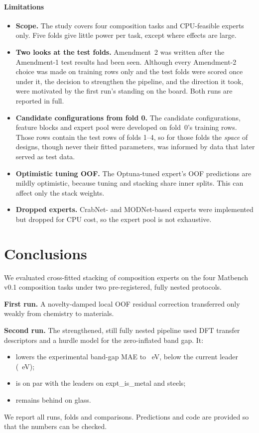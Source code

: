 \paragraph{Limitations}
\begin{itemize}
\item \textbf{Scope.} The study covers four composition tasks and CPU-feasible experts only. Five folds give little power per task, except where effects are large.
\item \textbf{Two looks at the test folds.} Amendment~2 was written after the Amendment-1 test results had been seen. Although every Amendment-2 choice was made on training rows only and the test folds were scored once under it, the decision to strengthen the pipeline, and the direction it took, were motivated by the first run's standing on the board. Both runs are reported in full.
\item \textbf{Candidate configurations from fold 0.} The candidate configurations, feature blocks and expert pool were developed on fold~0's training rows. Those rows contain the test rows of folds 1--4, so for those folds the \emph{space} of designs, though never their fitted parameters, was informed by data that later served as test data.
\item \textbf{Optimistic tuning OOF.} The Optuna-tuned expert's OOF predictions are mildly optimistic, because tuning and stacking share inner splits. This can affect only the stack weights.
\item \textbf{Dropped experts.} CrabNet- and MODNet-based experts were implemented but dropped for CPU cost, so the expert pool is not exhaustive.
\end{itemize}

\section{Conclusions}
\label{sec:conclusions}
We evaluated cross-fitted stacking of composition experts on the four Matbench v0.1 composition tasks under two pre-registered, fully nested protocols.

\textbf{First run.} A novelty-damped local OOF residual correction transferred only weakly from chemistry to materials.

\textbf{Second run.} The strengthened, still fully nested pipeline used DFT transfer descriptors and a hurdle model for the zero-inflated band gap. It:
\begin{itemize}
\item lowers the experimental band-gap MAE to \AtwoFinalGap~eV, below the current leader (\AtwoLeaderGap~eV);
\item is on par with the leaders on expt\_is\_metal and steels;
\item remains behind on glass.
\end{itemize}

We report all runs, folds and comparisons. Predictions and code are provided so that the numbers can be checked.
